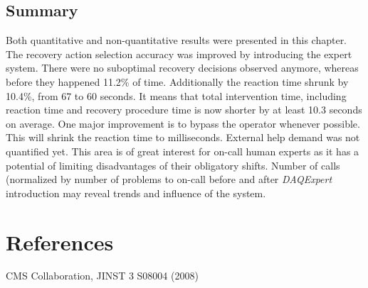 \documentclass[a4paper]{jpconf}
\begin{document}
\subsection{Summary}
Both quantitative and non-quantitative results were presented in this chapter. The recovery action selection accuracy was improved by introducing the expert system. There were no suboptimal recovery decisions observed anymore, whereas before they happened 11.2\% of time. Additionally the reaction time shrunk by 10.4\%, from 67 to 60 seconds. It means that total intervention time, including reaction time and recovery procedure time is now shorter by at least 10.3 seconds on average. One major improvement is to bypass the operator whenever possible. This will shrink the reaction time to milliseconds.
External help demand was not quantified yet. This area is of great interest for on-call human experts as it has a potential of limiting disadvantages of their obligatory shifts. Number of calls (normalized by number of problems to on-call before and after {\it DAQExpert} introduction may reveal trends and influence of the system.


\section*{References}
\begin{thebibliography}{9}

 CMS Collaboration, JINST 3 S08004 (2008)
\end{thebibliography}
\end{document}

